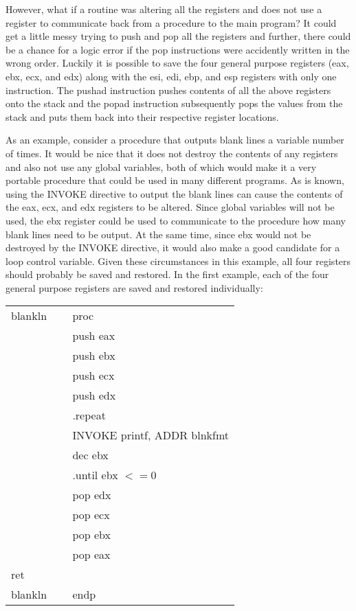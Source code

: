 \documentclass[10pt]{article}
\begin{document}
However, what if a routine was altering all the registers and does not use a register to communicate back from a procedure to the main program? It could get a little messy trying to push and pop all the registers and further, there could be a chance for a logic error if the pop instructions were accidently written in the wrong order. Luckily it is possible to save the four general purpose registers (eax, ebx, ecx, and edx) along with the esi, edi, ebp, and esp registers with only one instruction. The pushad instruction pushes contents of all the above registers onto the stack and the popad instruction subsequently pops the values from the stack and puts them back into their respective register locations.

As an example, consider a procedure that outputs blank lines a variable number of times. It would be nice that it does not destroy the contents of any registers and also not use any global variables, both of which would make it a very portable procedure that could be used in many different programs. As is known, using the INVOKE directive to output the blank lines can cause the contents of the eax, ecx, and edx registers to be altered. Since global variables will not be used, the ebx register could be used to communicate to the procedure how many blank lines need to be output. At the same time, since ebx would not be destroyed by the INVOKE directive, it would also make a good candidate for a loop control variable. Given these circumstances in this example, all four registers should probably be saved and restored. In the first example, each of the four general purpose registers are saved and restored individually:

\begin{center}
\begin{tabular}{ll}
blankln $\quad$ & proc \\
 & push eax \\
 & push ebx \\
 & push ecx \\
 & push edx \\
 & .repeat \\
 & INVOKE printf, ADDR blnkfmt \\
 & dec ebx \\
 & .until ebx $<=0$ \\
 & pop edx \\
 & pop ecx \\
 & pop ebx \\
 & pop eax \\
ret &  \\
blankln & endp \\
\end{tabular}
\end{center}
\end{document}
